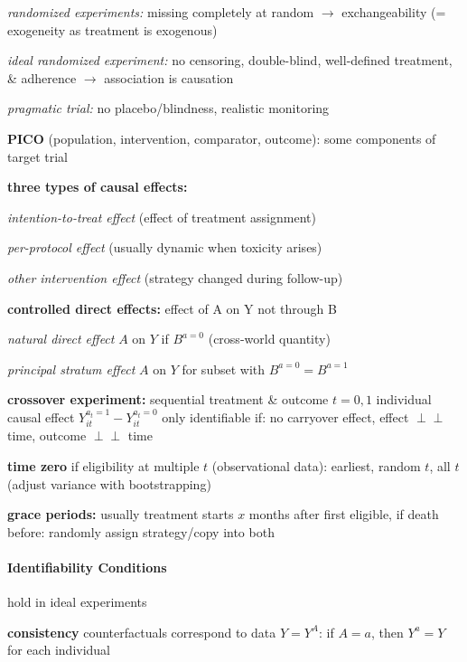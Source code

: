 \documentclass[8pt]{extarticle}
\newcommand{\indep}{\perp \!\!\! \perp}
\begin{document}
\begin{multicols}{2}
\noindent \textit{randomized experiments:} missing completely at random $\rightarrow$ exchangeability (= exogeneity as treatment is exogenous)

\noindent \textit{ideal randomized experiment:} no censoring, double-blind, well-defined treatment, \& adherence $\rightarrow$ association is causation

\noindent \textit{pragmatic trial:} no placebo/blindness, realistic monitoring


\noindent \textbf{PICO} (population, intervention, comparator, outcome): some components of target trial

\noindent \textbf{three types of causal effects:}

\textit{intention-to-treat effect} (effect of treatment assignment)

\textit{per-protocol effect} (usually dynamic when toxicity arises)

\textit{other intervention effect} (strategy changed during follow-up)


\noindent \textbf{controlled direct effects:} effect of A on Y not through B

\textit{natural direct effect}  $A$ on $Y$ if $B^{a=0}$ (cross-world quantity)

\textit{principal stratum effect} $A$ on $Y$ for subset with $B^{a=0} = B^{a=1}$

\noindent \textbf{crossover experiment:} sequential treatment \& outcome $t{=}0,1$
\newline
individual causal effect $Y_{it}^{a_t=1} - Y_{it}^{a_t=0}$ only identifiable if: no carryover effect, effect $\indep$ time, outcome $\indep$ time

\noindent \textbf{time zero} if eligibility at multiple $t$ (observational data):
earliest, random $t$, all $t$ (adjust variance with bootstrapping)

\noindent \textbf{grace periods:} usually treatment starts $x$ months after first eligible, if death before: randomly assign strategy/copy into both




\paragraph{\large Identifiability Conditions} hold in ideal experiments

\noindent \textbf{consistency} counterfactuals correspond to data $Y=Y^A$: \newline
 if $A=a$, then $Y^a=Y$ for each individual
 

\end{multicols}
\end{document}

